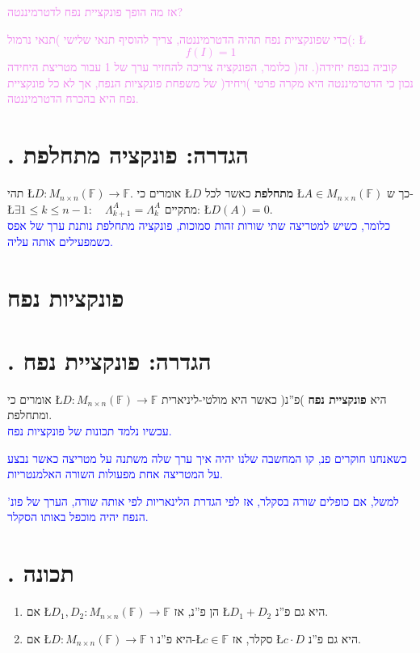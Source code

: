 \documentclass[english,hebrew]{article}
\begin{document}
\textcolor{violet}{אז מה הופך פונקציית נפח לדטרמיננטה?}

\textcolor{violet}{כדי שפונקציית נפח תהיה הדטרמיננטה, צריך להוסיף
תנאי שלישי )תנאי נרמול(: \L{%
\[
f(I)=1
\]
}%
כלומר, הפונקציה צריכה להחזיר ערך של 1 עבור מטריצת היחידה )קוביה בנפח
יחידה(. זה נכון כי הדטרמיננטה היא מקרה פרטי )ויחיד( של משפחת פונקציות
הנפח, אך לא כל פונקציית נפח היא בהכרח הדטרמיננטה.}

\section{{\endL}. הגדרה: פונקציה מתחלפת}

תהי \L{$D\colon M_{n\times n}(\mathbb{F})\to\mathbb{F}$}. אומרים
כי \L{$D$} \textbf{מתחלפת} כאשר לכל \L{$A\in M_{n\times n}(\mathbb{F})$}
כך ש- \L{$\exists1\leq k\leq n-1:\quad\Lambda_{k+1}^{A}=\Lambda_{k}^{A}$}
מתקיים: \L{$D(A)=0$}.\\

\textcolor{blue}{כלומר, כשיש למטריצה שתי שורות זהות סמוכות, פונקציה
מתחלפת נותנת ערך של אפס כשמפעילים אותה עליה.}

\section{פונקציות נפח}

\section{{\endL}. הגדרה: פונקציית נפח}

אומרים כי \L{$D\colon M_{n\times n}(\mathbb{F})\to\mathbb{F}$} היא
\textbf{פונקציית נפח} )פ\textquotedblright נ( כאשר היא מולטי-ליניארית
ומתחלפת.\\

\textcolor{blue}{עכשיו נלמד תכונות של פונקציות נפח.}

\textcolor{blue}{כשאנחנו חוקרים פ\textquotedbl נ, קו המחשבה שלנו
יהיה איך ערך שלה משתנה על מטריצה כאשר נבצע על המטריצה אחת מפעולות
השורה האלמנטריות.}

\textcolor{blue}{למשל, אם כופלים שורה בסקלר, אז לפי הגדרת הלינאריות
לפי אותה שורה, הערך של פונ' הנפח יהיה מוכפל באותו הסקלר.}

\section{{\endL}. תכונה}
\begin{enumerate}
\item אם \L{$D_{1},D_{2}\colon M_{n\times n}(\mathbb{F})\to\mathbb{F}$}
הן פ\textquotedblright נ, אז \L{$D_{1}+D_{2}$} היא גם פ\textquotedblright נ.
\item אם \L{$D\colon M_{n\times n}(\mathbb{F})\to\mathbb{F}$} היא פ\textquotedblright נ
ו-\L{$c\in\mathbb{F}$} סקלר, אז \L{$c\cdot D$} היא גם פ\textquotedblright נ.
\end{enumerate}
\end{document}
